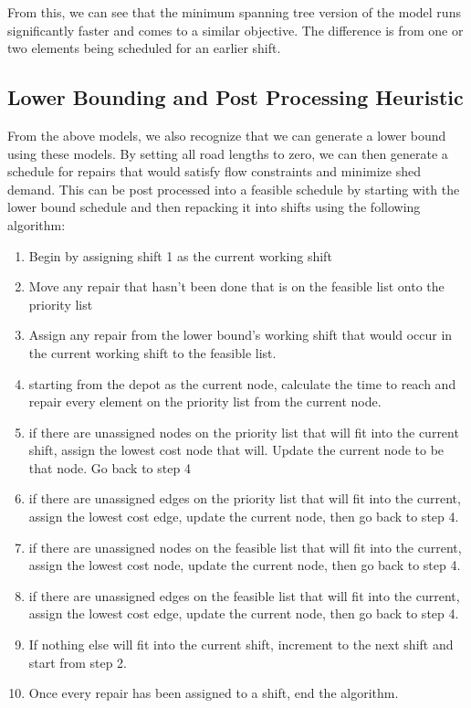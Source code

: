 \documentclass{article}
\begin{document}
From this, we can see that the minimum spanning tree version of the model runs significantly faster and comes to a similar objective. The difference is from one or two elements being scheduled for an earlier shift.

	\subsection{Lower Bounding and Post Processing Heuristic}
	
	From the above models, we also recognize that we can generate a lower bound using these models. By setting all road lengths to zero, we can then generate a schedule for repairs that would satisfy flow constraints and minimize shed demand. This can be post processed into a feasible schedule by starting with the lower bound schedule and then repacking it into shifts using the following algorithm:
	\begin{enumerate}
		\item Begin by assigning shift 1 as the current working shift
		\item Move any repair that hasn't been done that is on the feasible list onto the priority list
		\item Assign any repair from the lower bound's working shift that would occur in the current working shift to the feasible list.
		\item starting from the depot as the current node, calculate the time to reach and repair every element on the priority list from the current node.
		\item if there are unassigned nodes on the priority list that will fit into the current shift, assign the lowest cost node that will. Update the current node to be that node. Go back to step 4 
		\item if there are unassigned edges on the priority list that will fit into the current, assign the lowest cost edge, update the current node, then go back to step 4.
		\item if there are unassigned nodes on the feasible list that will fit into the current, assign the lowest cost node, update the current node, then go back to step 4.
		\item if there are unassigned edges on the feasible list that will fit into the current, assign the lowest cost edge, update the current node, then go back to step 4.
		\item If nothing else will fit into the current shift, increment to the next shift and start from step 2.
		\item Once every repair has been assigned to a shift, end the algorithm.
	\end{enumerate}
	
\end{document}
